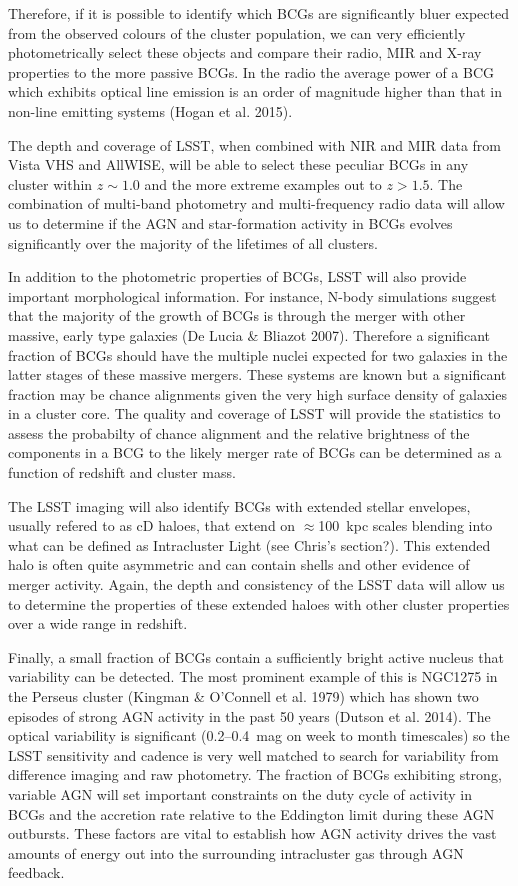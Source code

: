 \documentclass[a4paper,11pt]{article}
\begin{document}
Therefore, if it is possible to identify which BCGs are
significantly bluer expected from the observed colours
of the cluster population, we can very efficiently
photometrically select these objects and compare
their radio, MIR and X-ray properties to the 
more passive BCGs. In the radio the average power
of a BCG which exhibits optical line emission is
an order of magnitude higher than that in non-line
emitting systems (Hogan et al. 2015). 

The depth and coverage of LSST, when combined
with NIR and MIR data from Vista VHS and AllWISE,
will be able to select these peculiar BCGs in
any cluster within $z\sim 1.0$ and the more
extreme examples out to $z>1.5$. The combination
of multi-band photometry and multi-frequency
radio data will allow us to determine if the 
AGN and star-formation activity in BCGs evolves
significantly over the majority of the lifetimes
of all clusters.

In addition to the photometric properties
of BCGs, LSST will also provide important
morphological information. For instance,
N-body simulations suggest that the majority
of the growth of BCGs is through the merger
with other massive, early type galaxies 
(De Lucia \& Bliazot 2007). Therefore a
significant fraction of BCGs should have 
the multiple nuclei expected for two 
galaxies in the latter stages of these
massive mergers. These systems are known
but a significant fraction may be chance
alignments given the very high surface density of galaxies
in a cluster core. The quality and coverage of
LSST will provide the statistics to assess
the probabilty of chance alignment and the
relative brightness of the components
in a BCG to the likely merger rate of BCGs
can be determined as a function of redshift
and cluster mass.

The LSST imaging will also identify BCGs
with extended stellar envelopes,
usually refered to as cD haloes,
that extend on $\approx$100~kpc scales
blending into what can be defined
as Intracluster Light (see Chris's section?).
This extended halo is often quite asymmetric
and can contain shells and other evidence
of merger activity. Again, the depth and
consistency of the LSST data will allow us
to determine the properties of these 
extended haloes with other cluster properties
over a wide range in redshift.

Finally, a small fraction of BCGs contain a
sufficiently bright active nucleus that
variability can be detected. The most prominent
example of this is NGC1275 in the Perseus cluster
(Kingman \& O'Connell et al. 1979) which has shown 
two episodes of strong AGN activity in the past
50 years (Dutson et al. 2014). The optical
variability is significant (0.2--0.4~mag on
week to month timescales) so the LSST sensitivity
and cadence is very well matched to search for 
variability from difference imaging and raw
photometry. The fraction of BCGs exhibiting 
strong, variable AGN will set important
constraints on the duty cycle of activity in 
BCGs and the accretion rate relative to 
the Eddington limit during these AGN outbursts.
These factors are vital to establish how
AGN activity drives the vast amounts of energy
out into the surrounding intracluster gas
through AGN feedback.
\end{document}
